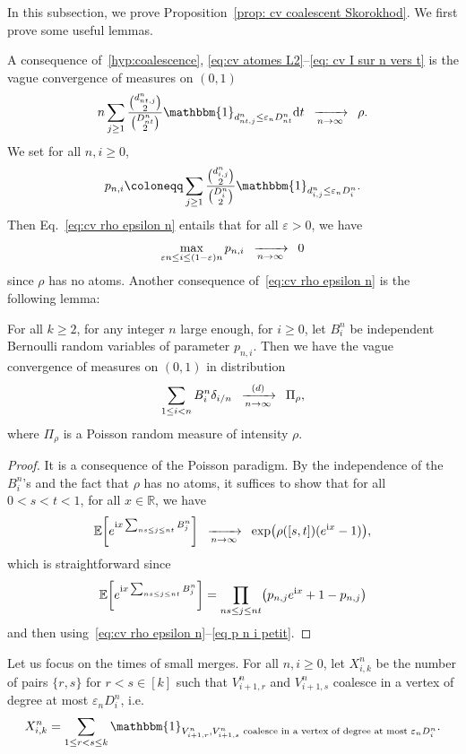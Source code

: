 \documentclass[AHL,Unicode,published]{cedram}
\newcommand{\e}{\varepsilon}
\newcommand{\cv}[1][n]{\enskip\xrightarrow[#1 \to \infty]{}\enskip}
\newcommand{\cvloi}[1][n]{\enskip\xrightarrow[#1 \to \infty]{(d)}\enskip}
\newcommand{\rmd}{\mathrm{d}}
\newcommand{\rmi}{\mathrm{i}}
\newcommand{\R}{\mathbb{R}}
\newcommand{\E}{\mathbb{E}}
\newcommand{\1}{\mathbbm{1}}
\let\originalleft\left
\let\originalright\right
\renewcommand{\left}{\mathopen{}\mathclose\bgroup\originalleft}
\renewcommand{\right}{\aftergroup\egroup\originalright}
\renewcommand*{\to}{\mathchoice{\longrightarrow}{\rightarrow}{\rightarrow}{\rightarrow}}
\begin{document}
In this subsection, we prove Proposition~\ref{prop: cv coalescent Skorokhod}. We first prove some useful lemmas.

A consequence of~\ref{hyp:coalescence}, \eqref{eq:cv atomes L2}--\eqref{eq: cv I sur n vers t} is the vague convergence of measures on $(0,1)$
\begin{equation}\label{eq:cv rho epsilon n}
n\sum_{j\ge 1} \frac{\binom{d^n_{nt,j}}{2}}{\binom{D^n_{nt}}{2}} \1_{d^n_{nt,j}\le \e_n D^n_{nt}} \rmd t
\cv[n]
\rho.
\end{equation}
We set for all $n,i\ge 0$,
\[
p_{n,i}\coloneqq \sum_{j\ge 1} \frac{\binom{d^n_{i,j}}{2}}{\binom{D^n_{i}}{2}} \1_{d^n_{i,j}\le \e_n D^n_{i}}.
\]
Then Eq.~\eqref{eq:cv rho epsilon n} entails that for all $\e>0$, we have
\begin{equation}\label{eq p n i petit}
\max_{\e n \le i \le (1-\e)n} p_{n,i} \cv[n] 0
\end{equation}
since $\rho$ has no atoms. Another consequence of~\eqref{eq:cv rho epsilon n} is the following lemma:

\begin{lemm}\label{lemme Bernoulli Poisson}
For all $k\ge 2$, for any integer $n$ large enough, for $i\ge 0$, let $B^n_{i}$ be independent Bernoulli random variables of parameter $p_{n,i}$. Then we have the {vague} convergence of measures on $(0,1)$ in distribution
\[
\sum_{1\le i <n} B^n_{i} \delta_{i/n}
\cvloi[n]
\Pi_{\rho},
\]
where $\Pi_\rho$ is a Poisson random measure of intensity $\rho$.
\end{lemm}

\begin{proof}
It is a consequence of the Poisson paradigm. By the independence of the $B^n_{i}$'s and the fact that $\rho$ has no atoms, it suffices to show that for all $0<s<t<1$, for all $x\in \R$, we have
\[
\E \left[e^{\rmi x \sum_{ns \le j \le nt} B^n_{j}}
\right]
\cv[n]
\exp\left(\rho([s,t])(e^{\rmi x }-1)\right),
\]
which is straightforward since
\[
\E \left[e^{\rmi x \sum_{ns \le j \le nt} B^n_{j}}
\right] = \prod_{ns \le j \le nt} \left(p_{n,j}e^{\rmi x} +1-p_{n,j}
\right)
\]
and then using~\eqref{eq:cv rho epsilon n}--\eqref{eq p n i petit}.
\end{proof}

Let us focus on the times of small merges. For all $n,i\ge 0$, let $X^n_{i,k}$ be the number of pairs $\{r,s\}$ for $r<s \in[k]$ such that $V^n_{i+1,r}$ and $V^n_{i+1,s}$ coalesce in a vertex of degree at most $\e_n D^n_i$, i.e.
\[
X^n_{i,k} = \sum_{1\le r < s\le k} \1_{V^n_{i+1,r}, V^n_{i+1,s}
\text{ coalesce in a vertex of degree at most } \e_n D^n_i}.
\]
\end{document}
